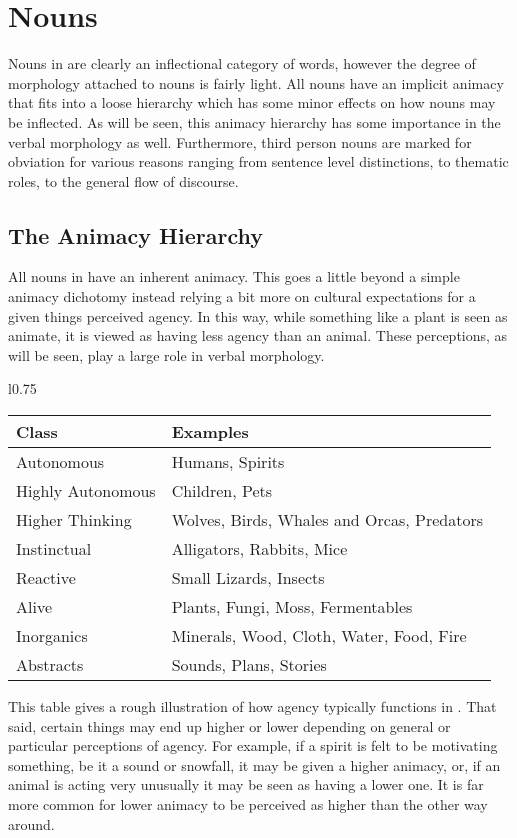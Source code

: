 \section{Nouns}
Nouns in \langname are clearly an inflectional category of words, however the degree of morphology attached to nouns is fairly light. All nouns have an implicit animacy that fits into a loose hierarchy which has some minor effects on how nouns may be inflected. As will be seen, this animacy hierarchy has some importance in the verbal morphology as well. Furthermore, third person nouns are marked for obviation for various reasons ranging from sentence level distinctions, to thematic roles, to the general flow of discourse.

\subsection{The Animacy Hierarchy}
All nouns in \langname have an inherent animacy. This goes a little beyond a simple animacy dichotomy instead relying a bit more on cultural expectations for a given things perceived agency. In this way, while something like a plant is seen as animate, it is viewed as having less agency than an animal. These perceptions, as will be seen, play a large role in verbal morphology.
\vspace{3mm}
  \begin{wrapfigure}{l}{0.75\textwidth}
    \begin{tabular}{|l|l|}
      \hline
      Class             & Examples                                    \\ \hline \hline
      Autonomous        & Humans, Spirits                             \\
      Highly Autonomous & Children, Pets                              \\  %
      Higher Thinking   & Wolves, Birds, Whales and Orcas, Predators  \\
      Instinctual       & Alligators, Rabbits, Mice                   \\
      Reactive          & Small Lizards, Insects                      \\
      Alive             & Plants, Fungi, Moss, Fermentables           \\
      Inorganics        & Minerals, Wood, Cloth, Water, Food, Fire    \\
      Abstracts         & Sounds, Plans, Stories                      \\ \hline
    \end{tabular}
  \end{wrapfigure}
  This table gives a rough illustration of how agency typically functions in \langname. That said, certain things may end up higher or lower depending on general or particular perceptions of agency. For example, if a spirit is felt to be motivating something, be it a sound or snowfall, it may be given a higher animacy, or, if an animal is acting very unusually it may be seen as having a lower one. It is far more common for lower animacy to be perceived as higher than the other way around. 


